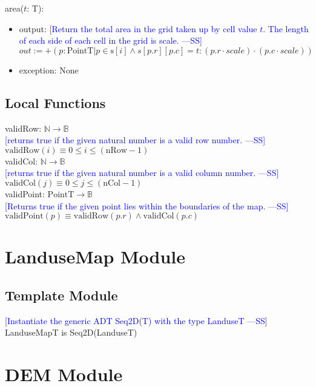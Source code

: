 \documentclass[12pt]{article}
\newcommand{\authornote}[3]{\textcolor{#1}{[#3 ---#2]}}
\newcommand{\authornote}[3]{}
\newcommand{\wss}[1]{\authornote{blue}{SS}{#1}}
\begin{document}
\noindent area($t$: T):
\begin{itemize}
\item output: \wss{Return the total area in the grid taken up by cell value $t$.
    The length of each side of each cell in the grid is
    scale.} $out := +(p: \mbox{PointT} | p \in \mbox{s}[i] \wedge
  s[p.r][p.c] = t : (p.r \cdot scale) \cdot (p.c \cdot scale))$
\item exception: None
\end{itemize}

\subsection*{Local Functions}

\noindent validRow: $\mathbb{N} \rightarrow \mathbb{B}$\\
\noindent \wss{returns true if the given natural number is a valid row
  number.}$\mbox{validRow}(i) \equiv 0 \leq i \leq (\mbox{nRow} - 1)$\\

\noindent validCol: $\mathbb{N} \rightarrow \mathbb{B}$\\
\noindent \wss{returns true if the given natural number is a valid column
  number.}$\mbox{validCol}(j) \equiv 0 \leq j \leq (\mbox{nCol} - 1)$\\

\noindent validPoint: $\mbox{PointT} \rightarrow \mathbb{B}$\\
\noindent \wss{Returns true if the given point lies within the boundaries of the
  map.}$\mbox{validPoint}(p) \equiv \mbox{validRow}(p.r) \wedge \mbox{validCol}(p.c)$\\

\newpage

\section* {LanduseMap Module}

\subsection* {Template Module}

\wss{Instantiate the generic ADT Seq2D(T) with the type LanduseT}\\LanduseMapT is Seq2D(LanduseT)

\newpage

\section* {DEM Module}
\end{document}
